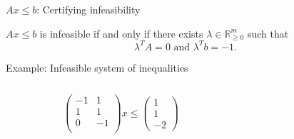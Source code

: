   
\begin{frame}{$Ax ≤b$: Certifying infeasibility}

    
        \begin{theorem}
          
          $Ax ≤b$  is infeasible if and only if there exists  $λ ∈ ℝ^m_{≥0}$ such that 
  \begin{displaymath}
    λ^T A = 0 \text{ and } λ^T b = -1.
  \end{displaymath}
\end{theorem}
        
    
  \end{frame}  
   
\begin{frame}{Example: Infeasible system of inequalities}

    \begin{columns}
      \begin{column}{.5\textwidth}

        \begin{displaymath}
          \begin{pmatrix}
            -1 & 1 \\
            1 & 1 \\
            0 & -1 \\ 
          \end{pmatrix} x ≤
          \begin{pmatrix}
            1 \\ 1 \\ -2
          \end{pmatrix}          
        \end{displaymath}        
      \end{column}
      \begin{column}{.5\textwidth}

      \end{column}       
    \end{columns}
  \end{frame}  
   
\begin{frame}{}

    \begin{columns}
      \begin{column}{.5\textwidth}

      \end{column}
      \begin{column}{.5\textwidth}

      \end{column}       
    \end{columns}
  \end{frame}  
   




